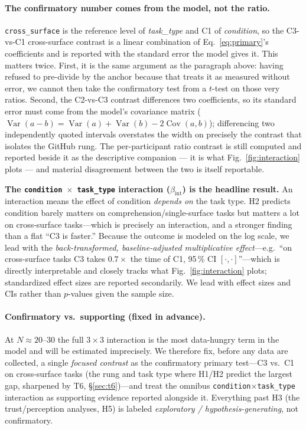 \documentclass[11pt]{article}
\newcommand{\code}[1]{\texttt{#1}}
\begin{document}
\paragraph{The confirmatory number comes from the model, not the ratio.}
\code{cross\_surface} is the reference level of \textit{task\_type} and C1 of
\textit{condition}, so the C3-vs-C1 cross-surface contrast is a linear
combination of Eq.~\eqref{eq:primary}'s coefficients and is reported with the
standard error the model gives it. This matters twice. First, it is the same
argument as the paragraph above: having refused to pre-divide by the anchor
because that treats it as measured without error, we cannot then take the
confirmatory test from a $t$-test on those very ratios. Second, the C2-vs-C3
contrast differences two coefficients, so its standard error must come from the
model's covariance matrix ($\operatorname{Var}(a-b) = \operatorname{Var}(a) +
\operatorname{Var}(b) - 2\operatorname{Cov}(a,b)$); differencing two
independently quoted intervals overstates the width on precisely the contrast
that isolates the GitHub rung. The per-participant ratio contrast is still
computed and reported beside it as the descriptive companion --- it is what
Fig.~\ref{fig:interaction} plots --- and material disagreement between the two
is itself reportable.

\textbf{The \code{condition $\times$ task\_type} interaction
($\beta_{\text{int}}$) is the headline result.} An interaction means the effect
of condition \emph{depends on} the task type. H2 predicts condition barely
matters on comprehension/single-surface tasks but matters a lot on cross-surface
tasks---which is precisely an interaction, and a stronger finding than a flat
``C3 is faster.'' Because the outcome is modeled on the log scale, we lead with
the \emph{back-transformed, baseline-adjusted multiplicative effect}---e.g.\ ``on
cross-surface tasks C3 takes $0.7\times$ the time of C1, 95\,\% CI
$[\cdot,\cdot]$''---which is directly interpretable and closely tracks what
Fig.~\ref{fig:interaction} plots; standardized effect sizes are reported
secondarily. We lead with effect sizes and CIs rather than $p$-values given the
sample size.

\paragraph{Confirmatory vs.\ supporting (fixed in advance).} At
$N\approx20$--$30$ the full $3\times3$ interaction is the most data-hungry term
in the model and will be estimated imprecisely. We therefore fix, before any data
are collected, a
single \emph{focused contrast} as the confirmatory primary test---C3 vs.\ C1 on
cross-surface tasks (the rung and task type where H1/H2 predict the largest gap,
sharpened by T6, \S\ref{sec:t6})---and treat the omnibus
\code{condition$\times$task\_type} interaction as supporting evidence reported
alongside it. Everything past H3 (the trust/perception analyses, H5) is labeled
\emph{exploratory / hypothesis-generating}, not confirmatory.
\end{document}
